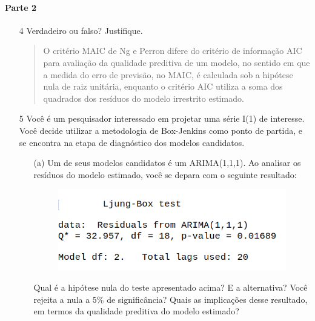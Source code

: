 \documentclass[10pt,a4paper]{article}
\begin{document}
	\paragraph{Parte 2}
	\begin{enumerate}
		\item[4] Verdadeiro ou falso? Justifique.
		
		\begin{quote}
			O critério MAIC de Ng e Perron difere do critério de informação AIC para avaliação da qualidade preditiva de um modelo, no sentido em que a medida do erro de previsão, no MAIC, é calculada sob a hipótese nula de raiz unitária, enquanto o critério AIC utiliza a soma dos quadrados dos resíduos do modelo irrestrito estimado.
		\end{quote}
		\item[5] Você é um pesquisador interessado em projetar uma série I(1) de interesse. Você decide utilizar a metodologia de Box-Jenkins como ponto de partida, e se encontra na etapa de diagnóstico dos modelos candidatos. 
		\begin{itemize}
			\item[(a)] Um de seus modelos candidatos é um ARIMA(1,1,1). Ao analisar os resíduos do modelo estimado, você se depara com o seguinte resultado:
			
			\begin{figure}[H]				
				\centering \includegraphics[scale=0.5]{figuras/lb.png}
			\end{figure}
			
			Qual é a hipótese nula do teste apresentado acima? E a alternativa? Você rejeita a nula a 5\% de significância? Quais as implicações desse resultado, em termos da qualidade preditiva do modelo estimado?
			

\end{itemize}
\end{enumerate}
\end{document}
